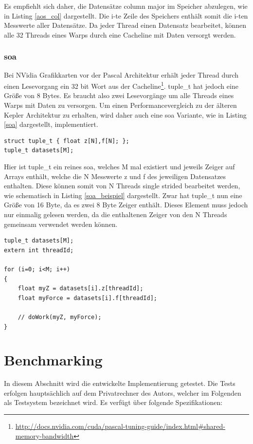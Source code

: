 Es empfiehlt sich daher, die Datensätze column major im Speicher abzulegen, wie in Listing \ref{aos_col} dargestellt. Die i-te Zeile des Speichers enthält somit die i-ten Messwerte aller Datensätze. Da jeder Thread einen Datensatz bearbeitet, können alle 32 Threads eines Warps durch eine Cacheline mit Daten versorgt werden.


\subsection{\acrlong{soa}}
Bei NVidia Grafikkarten vor der Pascal Architektur erhält jeder Thread durch einen Lesevorgang ein 32 bit Wort aus der Cacheline\footnote{\href{http://docs.nvidia.com/cuda/pascal-tuning-guide/index.html\#shared-memory-bandwidth}{http://docs.nvidia.com/cuda/pascal-tuning-guide/index.html\#shared-memory-bandwidth}}. tuple\_t hat jedoch eine Größe von 8 Bytes. 
Es braucht also zwei Lesevorgänge um alle Threads eines Warps mit Daten zu versorgen.
Um einen Performancevergleich zu der älteren Kepler Architektur zu erhalten, wird daher auch eine \gls{soa} Variante, wie in Listing \ref{soa} dargestellt, implementiert.

\begin{lstlisting}[label=soa,caption=Datenlayout \gls{soa}]
struct tuple_t { float z[N],f[N]; };
tuple_t datasets[M];
\end{lstlisting}

Hier ist tuple\_t ein reines \gls{soa}, welches M mal existiert und jeweils Zeiger auf Arrays enthält, welche die N Messwerte z und f des jeweiligen Datensatzes enthalten. Diese können somit von N Threads single strided bearbeitet werden, wie schematisch in Listing \ref{soa_beispiel} dargestellt.
Zwar hat tuple\_t nun eine Größe von 16 Byte, da es zwei 8 Byte Zeiger enthält. Dieses Element muss jedoch nur einmalig gelesen werden, da die enthaltenen Zeiger von den N Threads gemeinsam verwendet werden können.

\begin{lstlisting}[label=soa_beispiel,caption=Bearbeitung eines \gls{soa}]
tuple_t datasets[M];
extern int threadId;

for (i=0; i<M; i++)
{
    float myZ = datasets[i].z[threadId];
    float myForce = datasets[i].f[threadId];
    
    // doWork(myZ, myForce);
}
\end{lstlisting}


\chapter{Benchmarking}
In diesem Abschnitt wird die entwickelte Implementierung getestet. Die Tests erfolgen hauptsächlich auf dem Privatrechner des Autors, welcher im Folgenden als Testsystem bezeichnet wird. Es verfügt über folgende Spezifikationen:

